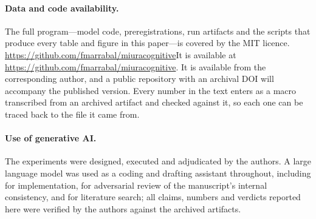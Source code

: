 \documentclass{article}
\newif\ifanon
\newcommand{\coderepo}{\url{https://github.com/fmarrabal/miuracognitive}}
\begin{document}
\paragraph{Data and code availability.} The full program---model code,
preregistrations, run artifacts and the scripts that produce every table and
figure in this paper---is covered by the MIT licence.
\ifanon The repository is withheld here for double-blind review; its URL and
an archival DOI will be given in the camera-ready version.
\else\ifdefined\coderepo It is available at \coderepo.
\else It is available from the corresponding author, and a public repository
with an archival DOI will accompany the published version.\fi\fi
Every number in the text enters as a macro transcribed from an archived
artifact and checked against it, so each one can be traced back to the file it
came from.

\paragraph{Use of generative AI.} The experiments were designed, executed and
adjudicated by the authors. A large language model was used as a coding and
drafting assistant throughout, including for implementation, for adversarial
review of the manuscript's internal consistency, and for literature search;
all claims, numbers and verdicts reported here were verified by the authors
against the archived artifacts.



\end{document}
